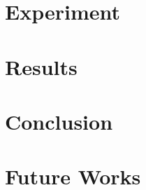 \documentclass[runningheads]{llncs}
\begin{document}
\section{Experiment}
    

\section{Results}
    

\section{Conclusion}
    

\section{Future Works}
    

%
%
%
% 
% 

\printbibliography

%     
\end{document}
